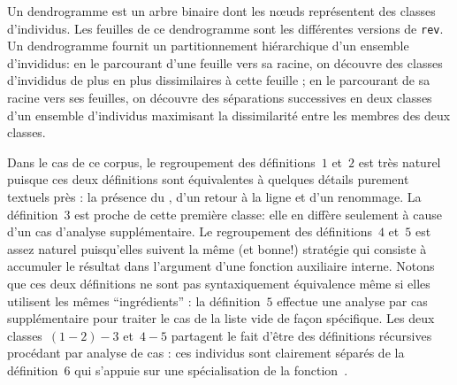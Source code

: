 \begin{center}
\end{center}

Un dendrogramme est un arbre binaire dont les n{\oe}uds représentent
des classes d'individus. Les feuilles de ce dendrogramme sont les
différentes versions de \texttt{rev}. Un dendrogramme fournit un
partitionnement hiérarchique d'un ensemble d'invididus: en le
parcourant d'une feuille vers sa racine, on découvre des classes
d'invididus de plus en plus dissimilaires à cette feuille ; en le
parcourant de sa racine vers ses feuilles, on découvre des séparations
successives en deux classes d'un ensemble d'individus maximisant
la dissimilarité entre les membres des deux classes.  

Dans le cas de ce corpus, le regroupement des définitions~$1$ et~$2$
est très naturel puisque ces deux définitions sont équivalentes à
quelques détails purement textuels près : la présence du \iocaml{|},
d'un retour à la ligne et d'un renommage. La définition~$3$ est proche
de cette première classe: elle en diffère seulement à cause d'un cas
d'analyse supplémentaire. Le regroupement des définitions~$4$ et~$5$
est assez naturel puisqu'elles suivent la même (et bonne!) stratégie
qui consiste à accumuler le résultat dans l'argument d'une fonction
auxiliaire interne. Notons que ces deux définitions ne sont pas
syntaxiquement équivalence même si elles utilisent les mêmes ``ingrédients'' :
la définition~$5$ effectue une analyse par cas supplémentaire pour
traiter le cas de la liste vide de façon spécifique. Les deux classes~$(1-2)-3$
et~$4-5$ partagent le fait d'être des définitions récursives procédant par
analyse de cas : ces individus sont clairement séparés de la définition~$6$
qui s'appuie sur une spécialisation de la fonction~.

